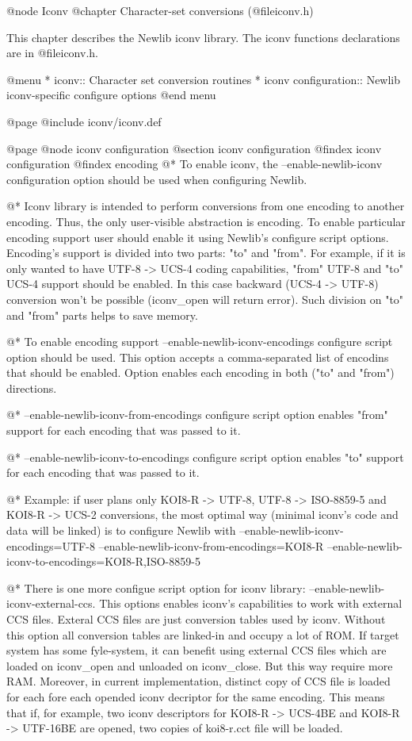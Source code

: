@node Iconv
@chapter Character-set conversions (@file{iconv.h})

This chapter describes the Newlib iconv library.
The iconv functions declarations are in
@file{iconv.h}.

@menu
* iconv::                 Character set conversion routines
* iconv configuration::   Newlib iconv-specific configure options
@end menu

@page
@include iconv/iconv.def

@page
@node iconv configuration
@section iconv configuration
@findex iconv configuration
@findex encoding
@*
To enable iconv, the --enable-newlib-iconv configuration option should be
used when configuring Newlib. 

@*
Iconv library is intended to perform conversions from one encoding to
another encoding. Thus, the only user-visible abstraction is encoding.
To enable particular encoding support user should enable it using
Newlib's configure script options. Encoding's support is divided into
two parts: "to" and "from". For example, if it is only wanted to have
UTF-8 -> UCS-4 coding capabilities, "from" UTF-8 and "to" UCS-4 support
should be enabled. In this case backward (UCS-4 -> UTF-8) conversion 
won't be possible (iconv_open will return error). Such division on "to"
and "from" parts helps to save memory.

@*
To enable encoding support --enable-newlib-iconv-encodings configure
script option should be used. This option accepts a comma-separated list
of encodins that should be enabled. Option enables each encoding in both
("to" and "from") directions.

@*
--enable-newlib-iconv-from-encodings configure script option enables
"from" support for each encoding that was passed to it.

@*
--enable-newlib-iconv-to-encodings configure script option enables
"to" support for each encoding that was passed to it.

@*
Example: if user plans only KOI8-R -> UTF-8, UTF-8 -> ISO-8859-5 and
KOI8-R -> UCS-2 conversions, the most optimal way (minimal iconv's
code and data will be linked) is to configure Newlib with 
--enable-newlib-iconv-encodings=UTF-8
--enable-newlib-iconv-from-encodings=KOI8-R
--enable-newlib-iconv-to-encodings=KOI8-R,ISO-8859-5

@*
There is one more configue script option for iconv library:
--enable-newlib-iconv-external-ccs. This options enables iconv's
capabilities to work with external CCS files. Exteral CCS files are just
conversion tables used by iconv. Without this option all conversion
tables are linked-in and occupy a lot of ROM. If target system has
some fyle-system, it can benefit using external CCS files which are
loaded on iconv_open and unloaded on iconv_close. But this way require
more RAM. Moreover, in current implementation, distinct copy of CCS file
is loaded for each fore each opended iconv decriptor for the same
encoding. This means that if, for example, two iconv descriptors for
KOI8-R -> UCS-4BE and KOI8-R -> UTF-16BE are opened, two copies of
koi8-r.cct file will be loaded. 

